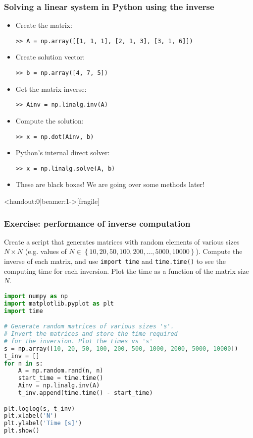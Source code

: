 \begin{frame}[fragile]
  \frametitle{Solving a linear system in Python using the inverse}
  \begin{itemize}
    \item Create the matrix:
    \begin{lstlisting}
>> A = np.array([[1, 1, 1], [2, 1, 3], [3, 1, 6]])    
    \end{lstlisting}\pause
    \item Create solution vector:
    \begin{lstlisting}
>> b = np.array([4, 7, 5]) 
    \end{lstlisting}\pause
    \item Get the matrix inverse:
    \begin{lstlisting}
>> Ainv = np.linalg.inv(A) 
    \end{lstlisting}\pause
    \item Compute the solution:
    \begin{lstlisting}
>> x = np.dot(Ainv, b)   
    \end{lstlisting}\pause
    \item Python's internal direct solver:
    \begin{lstlisting}
>> x = np.linalg.solve(A, b)
    \end{lstlisting}
    \item {}These are black boxes! We are going over some methods later!
  \end{itemize}
\end{frame}

\begin{frame}<handout:0|beamer:1->[fragile]
  \frametitle{Exercise: performance of inverse computation}
  Create a script that generates matrices with random elements of various sizes $N\times N$ (e.g. values of $N\in\left\{10,20,50,100,200,\ldots,5000,10000\right\}$). Compute the inverse of each matrix, and use \lstinline$import time$ and \lstinline$time.time()$ to see the computing time for each inversion. Plot the time as a function of the matrix size $N$. \pause
    \begin{lstlisting}[language=Python, basicstyle=\tiny]
import numpy as np
import matplotlib.pyplot as plt
import time

# Generate random matrices of various sizes 's'. 
# Invert the matrices and store the time required 
# for the inversion. Plot the times vs 's'
s = np.array([10, 20, 50, 100, 200, 500, 1000, 2000, 5000, 10000])
t_inv = []
for n in s:
    A = np.random.rand(n, n)
    start_time = time.time()
    Ainv = np.linalg.inv(A)
    t_inv.append(time.time() - start_time)

plt.loglog(s, t_inv)
plt.xlabel('N')
plt.ylabel('Time [s]')
plt.show()
    \end{lstlisting}
\end{frame}


